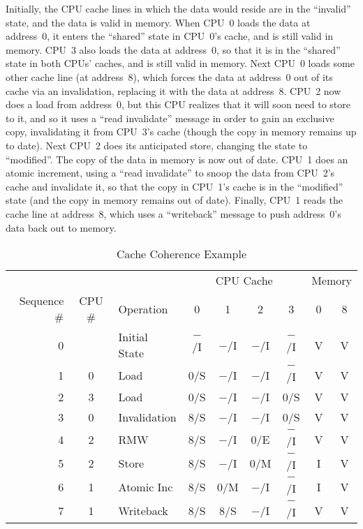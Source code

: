 Initially, the CPU cache lines in which the data would reside are
in the ``invalid'' state, and the data is valid in memory.
When CPU~0 loads the data at address~0, it enters the ``shared'' state in
CPU~0's cache, and is still valid in memory.
CPU~3 also loads the data at address~0, so that it is in the
``shared'' state in both CPUs' caches, and is still valid in memory.
Next CPU~0 loads some other cache line (at address~8),
which forces the data at address~0 out of its cache via an invalidation,
replacing it with the data at address~8.
CPU~2 now does a load from address~0, but this CPU realizes that it will
soon need to store to it, and so it uses a ``read invalidate'' message
in order to gain an exclusive copy, invalidating
it from CPU~3's cache (though the copy in memory remains up to date).
Next CPU~2 does its anticipated store, changing the state to ``modified''.
The copy of the data in memory is now out of date.
CPU~1 does an atomic increment, using a ``read invalidate'' to snoop
the data from CPU~2's cache
and invalidate it, so that the copy in CPU~1's cache is in the ``modified''
state (and the copy in memory remains out of date).
Finally, CPU~1 reads the cache line at address~8, which uses a
``writeback'' message to push address~0's data back out to memory.
\fi

\begin{table*}
\small
\centering
\begin{tabular}{r|c|l||c|c|c|c||c|c}
	& & & \multicolumn{4}{c||}{CPU Cache} & \multicolumn{2}{c}{Memory} \\
	\cline{4-7}
	Sequence \# & CPU \# & Operation & 0 & 1 & 2 & 3 & 0 & 8 \\
	\hline
	\hline
	0 &   & Initial State	& $-$/I & $-$/I & $-$/I & $-$/I   & V & V \\
	\hline
	1 & 0 & Load		& 0/S &   $-$/I & $-$/I & $-$/I   & V & V \\
	\hline
	2 & 3 & Load		& 0/S &   $-$/I & $-$/I & 0/S     & V & V \\
	\hline
	3 & 0 & Invalidation	& 8/S &   $-$/I & $-$/I & 0/S     & V & V \\
	\hline
	4 & 2 & RMW		& 8/S &   $-$/I & 0/E &   $-$/I   & V & V \\
	\hline
	5 & 2 & Store		& 8/S &   $-$/I & 0/M &   $-$/I   & I & V \\
	\hline
	6 & 1 & Atomic Inc	& 8/S &   0/M &   $-$/I & $-$/I   & I & V \\
	\hline
	7 & 1 & Writeback	& 8/S &   8/S &   $-$/I & $-$/I   & V & V \\
\end{tabular}
\caption{Cache Coherence Example}
\label{tab:app:whymb:Cache Coherence Example}
\end{table*}

